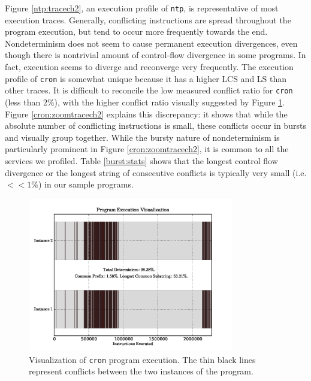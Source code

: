 Figure \ref{ntp:tracech2}, an execution profile of \texttt{ntp}, is representative
of most execution traces. Generally,
conflicting instructions are spread throughout
the program execution, but tend to occur more frequently
towards the end. Nondeterminism does not seem to cause permanent 
execution divergences, even though there is nontrivial amount
of control-flow divergence in some programs. In fact, execution seems to
diverge and reconverge very frequently.
The execution profile of \texttt{cron} is somewhat unique
because it has a higher LCS and LS than other traces. It is
difficult to reconcile the low measured conflict ratio for \texttt{cron} (less
than $2\%$), with the higher conflict ratio visually suggested by 
Figure \ref{cron:tracech2}. Figure \ref{cron:zoomtracech2} 
explains this discrepancy: it shows that while
the absolute number of conflicting instructions is small,
these conflicts occur in bursts and visually group together. 
While the bursty nature of nondeterminism
is particularly prominent in Figure \ref{cron:zoomtracech2},
it is common to all the services we profiled. Table \ref{burst:stats}
shows that the longest control flow divergence 
or the longest string of consecutive conflicts
is typically very small (i.e. $<<1\%$) 
in our sample programs.

\begin{figure}
  \center
  \includegraphics[trim=0cm 0cm 0cm 0cm, width=0.8\textwidth]{cron-ch2.png}
  \caption[Visualization of \texttt{cron} program execution]%
          {Visualization of \texttt{cron} program execution.
          The thin black lines represent conflicts between
          the two instances of the program.}
  \label{cron:tracech2}
\end{figure} 


